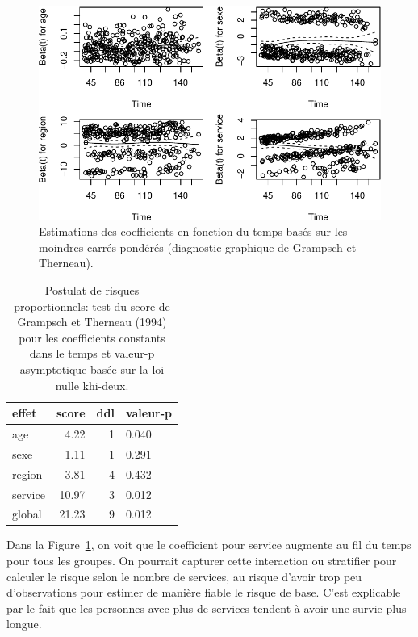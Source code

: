 \documentclass[
  11pt,
  letterpaper,
]{scrbook}
\theoremstyle{definition}
\theoremstyle{remark}
\begin{document}
\begin{figure}[ht!]

{\centering \includegraphics{./06-survie_files/figure-pdf/fig-coxphhypothese-1.pdf}

}

\caption{\label{fig-coxphhypothese}Estimations des coefficients en
fonction du temps basés sur les moindres carrés pondérés (diagnostic
graphique de Grampsch et Therneau).}

\end{figure}

\hypertarget{tbl-coxphhypothese}{}
\begin{table}
\caption{\label{tbl-coxphhypothese}Postulat de risques proportionnels: test du score de Grampsch et
Therneau (1994) pour les coefficients constants dans le temps et
valeur-p asymptotique basée sur la loi nulle khi-deux. }\tabularnewline

\centering
\begin{tabular}{lrrl}
\toprule
effet & score & ddl & valeur-p\\
\midrule
age & 4.22 & 1 & 0.040\\
sexe & 1.11 & 1 & 0.291\\
region & 3.81 & 4 & 0.432\\
service & 10.97 & 3 & 0.012\\
global & 21.23 & 9 & 0.012\\
\bottomrule
\end{tabular}
\end{table}

Dans la Figure~\ref{fig-coxphhypothese}, on voit que le coefficient pour
service augmente au fil du temps pour tous les groupes. On pourrait
capturer cette interaction ou stratifier pour calculer le risque selon
le nombre de services, au risque d'avoir trop peu d'observations pour
estimer de manière fiable le risque de base. C'est explicable par le
fait que les personnes avec plus de services tendent à avoir une survie
plus longue.
\end{document}
